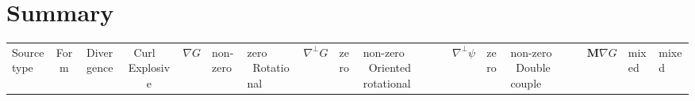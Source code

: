 \documentclass[11pt]{article}
\begin{document}
\section{Summary}

\begin{center}
\begin{tabular}{lccc}
\hline
Source type & Form & Divergence & Curl \
\hline
Explosive & $\nabla G$ & non-zero & zero \
Rotational & $\nabla^\perp G$ & zero & non-zero \
Oriented rotational & $\nabla^\perp \psi$ & zero & non-zero \
Double couple & $\bm{M}\nabla G$ & mixed & mixed \
\hline
\end{tabular}
\end{center}
\end{document}
